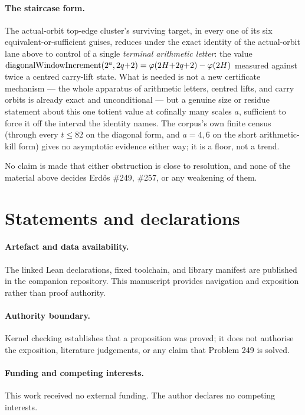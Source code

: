 \documentclass[11pt]{article}
\theoremstyle{plain}
\theoremstyle{definition}
\theoremstyle{remark}
\let\origmathrm\mathrm
\renewcommand{\mathrm}[1]{\ifmmode\origmathrm{#1}\else\textrm{#1}\fi}%
\begin{document}
\paragraph{The staircase form.} The actual-orbit top-edge cluster's surviving
target, in every one of its six equivalent-or-sufficient guises, reduces
under the exact identity of the actual-orbit lane above to control of a single \emph{terminal
arithmetic letter}: the value $\mathrm{diagonalWindowIncrement}(2^a,2q{+}2)
= \varphi(2H{+}2q{+}2)-\varphi(2H)$ measured against twice a centred
carry-lift state. What is needed is not a new certificate mechanism — the
whole apparatus of arithmetic letters, centred lifts, and carry orbits is
already exact and unconditional — but a genuine size or residue statement
about this one totient value at cofinally many scales $a$, sufficient to
force it off the interval the identity names. The corpus's own finite
census (through every $t\le82$ on the diagonal form, and $a=4,6$ on the short
arithmetic-kill form) gives no asymptotic evidence either way; it is a
floor, not a trend.

No claim is made that either obstruction is close to resolution, and none
of the material above decides Erdős \#249, \#257, or any weakening of them.

\clearpage
\section*{Statements and declarations}

\paragraph{Artefact and data availability.} The linked Lean declarations,
fixed toolchain, and library manifest are published in the companion
repository. This manuscript provides navigation and exposition rather than
proof authority.

\paragraph{Authority boundary.} Kernel checking establishes that a proposition
was proved; it does not authorise the exposition, literature judgements, or any
claim that Problem 249 is solved.

\paragraph{Funding and competing interests.} This work received no external
funding. The author declares no competing interests.
\end{document}
